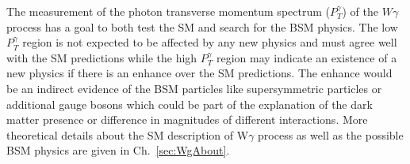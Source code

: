 The measurement of the photon transverse momentum spectrum ($P_T^{\gamma}$) of the $W\gamma$ process has a goal to both test the SM and search for the BSM physics. The low $P_T^{\gamma}$ region is not expected to be affected by any new physics and must agree well with the SM predictions while the high $P_T^{\gamma}$ region may indicate an existence of a new physics if there is an enhance over the SM predictions. The enhance would be an indirect evidence of the BSM particles like supersymmetric particles or additional gauge bosons which could be part of the explanation of the dark matter presence or difference in magnitudes of different interactions. More theoretical details about the SM description of W$\gamma$ process as well as the possible BSM physics are given in Ch.~\ref{sec:WgAbout}. \\   


